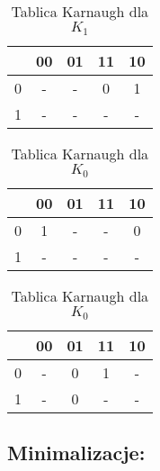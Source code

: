 \documentclass[12pt,a4paper]{article}
\begin{document}
\begin{table}[!ht]
\begin{minipage}{.5\textwidth}
			 		\vspace{0.4cm}
			 		
			 		\caption{Tablica Karnaugh dla $K_1$}
			 		\vspace{0.2cm}
			 		\centering
			 		\begin{tabular}{c|c|c|c|c}
			 			\backslashbox{$Q_2$}{$Q_1Q_0$}&00&01&11&10\\\hline
			 			0&	-&-&0&1\\\hline
			 			1&	-&-&-&-\\
			 		\end{tabular} 
				\end{minipage}
				 
			\end{table}
			
			\FloatBarrier
			
			\begin{table}[!ht]
				
				\begin{minipage}{.5\textwidth}
					\caption{Tablica Karnaugh dla $J_0$}
					\vspace{0.2cm}
					\centering
					\begin{tabular}{c|c|c|c|c}
						\backslashbox{$Q_2$}{$Q_1Q_0$}&00&01&11&10\\\hline
						0&	1&-&-&0\\\hline
						1&	-&-&-&-\\
					\end{tabular}
				\end{minipage}%
				\begin{minipage}{.5\textwidth}
					\caption{Tablica Karnaugh dla $K_0$}
					\vspace{0.2cm}
					\centering
					\begin{tabular}{c|c|c|c|c}
						\backslashbox{$Q_2$}{$Q_1Q_0$}&00&01&11&10\\\hline
						0&	-&0&1&-\\\hline
						1&	-&0&-&-\\
					\end{tabular} 
				\end{minipage}
					
			\end{table}
				
		\subsection{Minimalizacje:}
		
\end{document}
